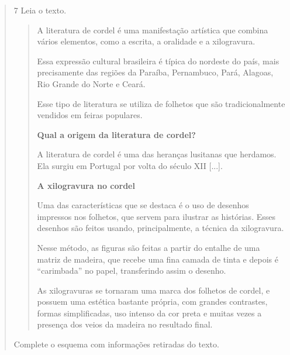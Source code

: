 \begin{escolha}
\begin{quote}
\num{7}  Leia o texto.

\begin{quote}
A literatura de cordel é uma manifestação artística que combina vários
elementos, como a escrita, a oralidade e a xilogravura.

Essa expressão cultural brasileira é típica do nordeste do país, mais
precisamente das regiões da Paraíba, Pernambuco, Pará, Alagoas, Rio
Grande do Norte e Ceará.

Esse tipo de literatura se utiliza de folhetos que são tradicionalmente
vendidos em feiras populares.

\textbf{Qual a origem da literatura de cordel?}

A literatura de cordel é uma das heranças lusitanas que herdamos. Ela
surgiu em Portugal por volta do século XII {[}...{]}.

\textbf{A xilogravura no cordel}

Uma das características que se destaca é o uso de desenhos impressos nos
folhetos, que servem para ilustrar as histórias. Esses desenhos são
feitos usando, principalmente, a técnica da xilogravura.

Nesse método, as figuras são feitas a partir do entalhe de uma matriz de
madeira, que recebe uma fina camada de tinta e depois é ``carimbada'' no
papel, transferindo assim o desenho.

As xilogravuras se tornaram uma marca dos folhetos de cordel, e possuem
uma estética bastante própria, com grandes contrastes, formas
simplificadas, uso intenso da cor preta e muitas vezes a presença dos
veios da madeira no resultado final.

\end{quote}


Complete o esquema com informações retiradas do texto.


\end{quote}
\end{escolha}
